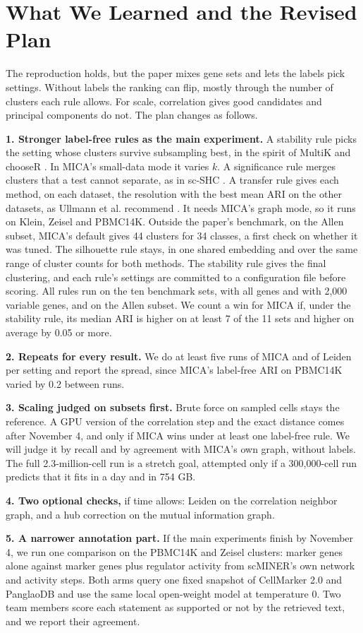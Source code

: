 \section{What We Learned and the Revised Plan}\label{sec:plan}
The reproduction holds, but the paper mixes gene sets and lets the labels pick settings. Without labels the ranking can flip, mostly through the number of clusters each rule allows. For scale, correlation gives good candidates and principal components do not. The plan changes as follows.

\textbf{1. Stronger label-free rules as the main experiment.} A stability rule picks the setting whose clusters survive subsampling best, in the spirit of MultiK and chooseR \cite{liu2021multik,pattersoncross2021chooser}. In MICA's small-data mode it varies $k$. A significance rule merges clusters that a test cannot separate, as in sc-SHC \cite{grabski2023significance}. A transfer rule gives each method, on each dataset, the resolution with the best mean ARI on the other datasets, as Ullmann et al. recommend \cite{ullmann2023overoptimistic}. It needs MICA's graph mode, so it runs on Klein, Zeisel and PBMC14K. Outside the paper's benchmark, on the Allen subset, MICA's default gives 44 clusters for 34 classes, a first check on whether it was tuned. The silhouette rule stays, in one shared embedding and over the same range of cluster counts for both methods. The stability rule gives the final clustering, and each rule's settings are committed to a configuration file before scoring. All rules run on the ten benchmark sets, with all genes and with 2,000 variable genes, and on the Allen subset. We count a win for MICA if, under the stability rule, its median ARI is higher on at least 7 of the 11 sets and higher on average by 0.05 or more.

\textbf{2. Repeats for every result.} We do at least five runs of MICA and of Leiden per setting and report the spread, since MICA's label-free ARI on PBMC14K varied by 0.2 between runs.

\textbf{3. Scaling judged on subsets first.} Brute force on sampled cells stays the reference. A GPU version of the correlation step and the exact distance comes after November 4, and only if MICA wins under at least one label-free rule. We will judge it by recall and by agreement with MICA's own graph, without labels. The full 2.3-million-cell run is a stretch goal, attempted only if a 300,000-cell run predicts that it fits in a day and in 754 GB.

\textbf{4. Two optional checks,} if time allows: Leiden on the correlation neighbor graph, and a hub correction \cite{amblard2022hubness} on the mutual information graph.

\textbf{5. A narrower annotation part.} If the main experiments finish by November 4, we run one comparison on the PBMC14K and Zeisel clusters: marker genes alone against marker genes plus regulator activity from scMINER's own network and activity steps. Both arms query one fixed snapshot of CellMarker 2.0 and PanglaoDB and use the same local open-weight model at temperature 0. Two team members score each statement as supported or not by the retrieved text, and we report their agreement.
